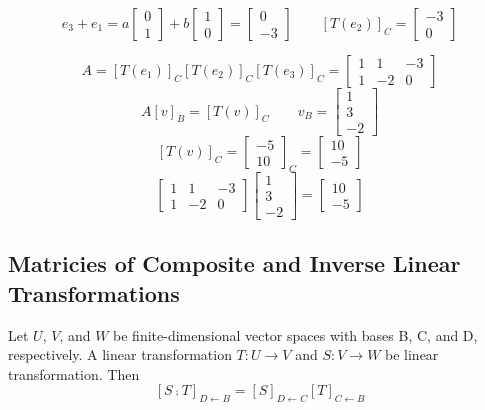 $$e_3 + e_1 = a\begin{bmatrix}
    0\\1
\end{bmatrix} + b\begin{bmatrix}
    1\\0
\end{bmatrix} = \begin{bmatrix}
    0\\-3
\end{bmatrix}\qquad [T(e_2)]_C = \begin{bmatrix}
    -3\\0
\end{bmatrix}$$

$$A = [T(e_1)]_C[T(e_2)]_C[T(e_3)]_C = \begin{bmatrix}
    1&1&-3\\1&-2&0
\end{bmatrix}$$
$$A[v]_B = [T(v)]_C\qquad v_B = \begin{bmatrix}
    1\\3\\-2
\end{bmatrix}$$
$$[T(v)]_C = \begin{bmatrix}
    -5\\10
\end{bmatrix}_C = \begin{bmatrix}
    10\\-5
\end{bmatrix}$$
$$\begin{bmatrix}
    1&1&-3\\1&-2&0
\end{bmatrix}\begin{bmatrix}
    1\\3\\-2
\end{bmatrix} = \begin{bmatrix}
    10\\-5
\end{bmatrix}$$

\subsection*{Matricies of Composite and Inverse Linear Transformations}
Let $U$, $V$, and $W$ be finite-dimensional vector spaces with bases B, C, and D, respectively. A linear transformation $T:U\rightarrow V$ and $S:V\rightarrow W$ be linear transformation. Then
$$[S\comp T]_{D\leftarrow B} = [S]_{D\leftarrow C}[T]_{C\leftarrow B}$$

